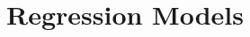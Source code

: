 \documentclass[12pt]{ociamthesis}\usepackage[]{graphicx}\usepackage[]{color}
\begin{document}
\appendix

\chapter{Regression Models}





\end{document}
